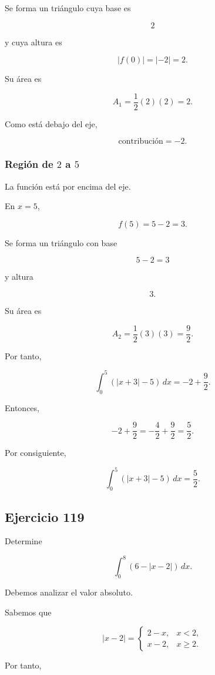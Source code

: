 \documentclass[12pt]{article}
\begin{document}
Se forma un triángulo cuya base es

\[
2
\]

y cuya altura es

\[
|f(0)|=|-2|=2.
\]

Su área es

\[
A_1
=
\frac12(2)(2)
=
2.
\]

Como está debajo del eje,

\[
\text{contribución}=-2.
\]

\subsubsection*{Región de \(2\) a \(5\)}

La función está por encima del eje.

En \(x=5\),

\[
f(5)=5-2=3.
\]

Se forma un triángulo con base

\[
5-2=3
\]

y altura

\[
3.
\]

Su área es

\[
A_2
=
\frac12(3)(3)
=
\frac92.
\]

Por tanto,

\[
\int_0^5(|x+3|-5)\,dx
=
-2+\frac92.
\]

Entonces,

\[
-2+\frac92
=
-\frac42+\frac92
=
\frac52.
\]

Por consiguiente,

\[
\boxed{
\int_0^5(|x+3|-5)\,dx
=
\frac52
}.
\]

\subsection*{Ejercicio 119}

Determine

\[
\int_0^8\left(6-|x-2|\right)\,dx.
\]

Debemos analizar el valor absoluto.

Sabemos que

\[
|x-2|
=
\begin{cases}
2-x, & x<2,\\
x-2, & x\geq2.
\end{cases}
\]

Por tanto,
\end{document}

